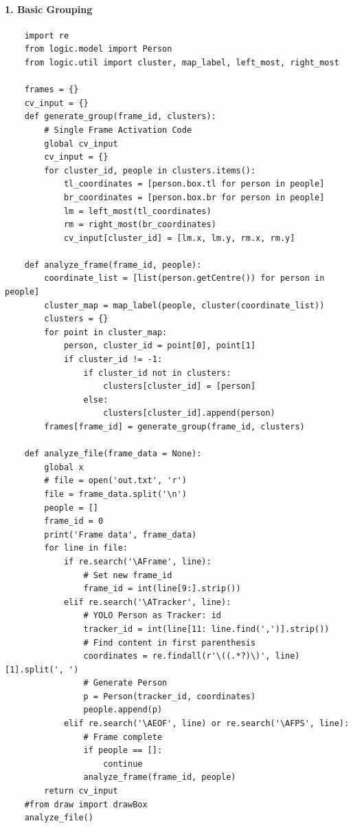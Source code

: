 \documentclass{fisatprojectfinal}
\begin{document}
\begin{appendices}

\paragraph{1. Basic Grouping}
\begin{verbatim}
    import re
    from logic.model import Person
    from logic.util import cluster, map_label, left_most, right_most
    
    frames = {}
    cv_input = {}
    def generate_group(frame_id, clusters):
        # Single Frame Activation Code
        global cv_input
        cv_input = {}
        for cluster_id, people in clusters.items():
            tl_coordinates = [person.box.tl for person in people]
            br_coordinates = [person.box.br for person in people]
            lm = left_most(tl_coordinates)
            rm = right_most(br_coordinates)
            cv_input[cluster_id] = [lm.x, lm.y, rm.x, rm.y]
            
    def analyze_frame(frame_id, people):
        coordinate_list = [list(person.getCentre()) for person in people]
        cluster_map = map_label(people, cluster(coordinate_list))
        clusters = {}
        for point in cluster_map:
            person, cluster_id = point[0], point[1]
            if cluster_id != -1:
                if cluster_id not in clusters:
                    clusters[cluster_id] = [person]
                else:
                    clusters[cluster_id].append(person)
        frames[frame_id] = generate_group(frame_id, clusters)
    
    def analyze_file(frame_data = None):
        global x
        # file = open('out.txt', 'r')
        file = frame_data.split('\n')
        people = []
        frame_id = 0
        print('Frame data', frame_data)
        for line in file:
            if re.search('\AFrame', line):
                # Set new frame_id
                frame_id = int(line[9:].strip())
            elif re.search('\ATracker', line):
                # YOLO Person as Tracker: id
                tracker_id = int(line[11: line.find(',')].strip())
                # Find content in first parenthesis
                coordinates = re.findall(r'\((.*?)\)', line)[1].split(', ')
                # Generate Person 
                p = Person(tracker_id, coordinates)
                people.append(p)
            elif re.search('\AEOF', line) or re.search('\AFPS', line):
                # Frame complete
                if people == []:
                    continue
                analyze_frame(frame_id, people)
        return cv_input
    #from draw import drawBox
    analyze_file()
\end{verbatim}


\end{appendices}
\end{document}
